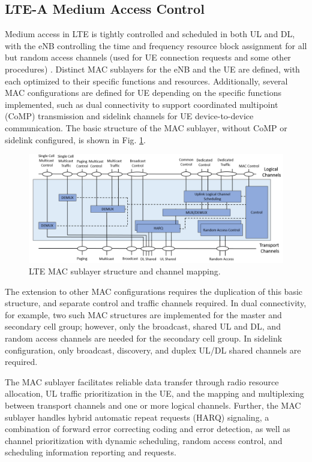 \subsection{LTE-A Medium Access Control}
\label{lte-mac}
Medium access in LTE is tightly controlled and scheduled in both UL and DL, with the eNB controlling the time and frequency resource block assignment for all but random access channels (used for UE connection requests and some other procedures) \cite{tr36321}.  Distinct MAC sublayers for the eNB and the UE are defined, with each optimized to their specific functions and resources.  Additionally, several MAC configurations are defined for UE depending on the specific functions implemented, such as dual connectivity to support coordinated multipoint (CoMP) transmission and sidelink channels for UE device-to-device communication. The basic structure of the MAC sublayer, without CoMP or sidelink configured, is shown in Fig. \ref{figs:lte-mac}.
\begin{figure}[!ht]
	\centering
	\includegraphics[width=\textwidth]{figures3/LTE-MAC}	
	\caption{LTE MAC sublayer structure and channel mapping.}
	\label{figs:lte-mac}
\end{figure}
The extension to other MAC configurations requires the duplication of this basic structure, and separate control and traffic channels required. In dual connectivity, for example, two such MAC structures are implemented for the master and secondary cell group; however, only the broadcast, shared UL and DL, and random access channels are needed for the secondary cell group.  In sidelink configuration, only broadcast, discovery, and duplex UL/DL shared channels are required.

The MAC sublayer facilitates reliable data transfer through radio resource allocation, UL traffic prioritization in the UE, and the mapping and multiplexing between transport channels and one or more logical channels. Further, the MAC sublayer handles hybrid automatic repeat requests (HARQ) signaling, a combination of forward error correcting coding and error detection, as well as channel prioritization with dynamic scheduling, random access control, and scheduling information reporting and requests.


